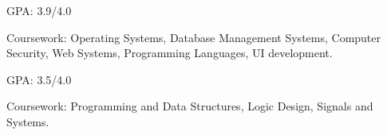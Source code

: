 
\USC
{}
\vspace{1.3ex} %

\UM
{}
\begin{miniItemize}
    \item GPA: 3.9/4.0
    \item Coursework: 
        Operating Systems,
        Database Management Systems,
        Computer Security,
        Web Systems,
        Programming Languages,
        UI development.
\end{miniItemize}

\SJTU
{}
\begin{miniItemize}
    \item GPA: 3.5/4.0
    \item Coursework:
        Programming and Data Structures,
        Logic Design,
        Signals and Systems.
\end{miniItemize}
